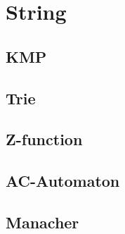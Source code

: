 \section{String}
\subsection{KMP}
\raggedbottom
\subsection{Trie}
\raggedbottom
\subsection{Z-function}
\raggedbottom
\subsection{AC-Automaton}
\raggedbottom
\subsection{Manacher}
\raggedbottom
\hrulefill
\pagebreak

